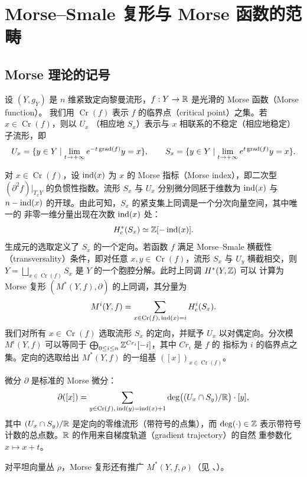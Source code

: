 \section{Morse--Smale 复形与 Morse 函数的范畴}

\subsection{Morse 理论的记号}

设 $(Y,g_Y)$ 是 $n$ 维紧致定向黎曼流形，$f:Y\to\mathbb{R}$ 是光滑的 Morse 函数（Morse function）。
我们用 $\operatorname{Cr}(f)$ 表示 $f$ 的临界点（critical point）之集。若 $x\in\operatorname{Cr}(f)$，则以 $U_x$
（相应地 $S_x$）表示与 $x$ 相联系的不稳定（相应地稳定）子流形，即
\[
  U_x=\{y\in Y\mid \lim_{t\to+\infty}e^{-t\operatorname{grad}(f)}y=x\},\qquad
  S_x=\{y\in Y\mid \lim_{t\to+\infty}e^{t\operatorname{grad}(f)}y=x\}.
\]

对 $x\in\operatorname{Cr}(f)$，设 $\operatorname{ind}(x)$ 为 $x$ 的 Morse 指标（Morse index），即二次型
$(\partial^2f)|_{T_xY}$ 的负惯性指数。流形 $S_x$ 与 $U_x$ 分别微分同胚于维数为 $\operatorname{ind}(x)$ 与
$n-\operatorname{ind}(x)$ 的开球。由此可知，$S_x$ 的紧支集上同调是一个分次向量空间，其中唯一的
非零一维分量出现在次数 $\operatorname{ind}(x)$ 处：
\[
  H^*_c(S_x)\simeq\mathbb{Z}[-\operatorname{ind}(x)].
\]
生成元的选取定义了 $S_x$ 的一个定向。若函数 $f$ 满足 Morse--Smale 横截性
（transversality）条件，即对任意 $x,y\in\operatorname{Cr}(f)$，流形 $S_x$ 与 $U_y$ 横截相交，则
$Y=\bigsqcup_{x\in\operatorname{Cr}(f)}S_x$ 是 $Y$ 的一个胞腔分解。此时上同调 $H^*(Y,\mathbb{Z})$ 可以
计算为 Morse 复形 $(M^*(Y,f),\partial)$ 的上同调，其分量为
\[
  M^i(Y,f)=\sum_{x\in\operatorname{Cr}(f),\,\operatorname{ind}(x)=i}H^i_c(S_x).
\]
我们对所有 $x\in\operatorname{Cr}(f)$ 选取流形 $S_x$ 的定向，并赋予 $U_x$ 以对偶定向。分次模
$M^i(Y,f)$ 可以等同于 $\bigoplus_{0\le i\le n}\mathbb{Z}^{Cr_i}[-i]$，其中 $Cr_i$ 是 $f$ 的
指标为 $i$ 的临界点之集。定向的选取给出 $M^*(Y,f)$ 的一组基 $([x])_{x\in\operatorname{Cr}(f)}$。

微分 $\partial$ 是标准的 Morse 微分：
\[
  \partial([x])=\sum_{y\in\operatorname{Cr}(f),\,\operatorname{ind}(y)=\operatorname{ind}(x)+1}
  \deg\bigl((U_x\cap S_y)/\mathbb{R}\bigr)\cdot[y],
\]
其中 $(U_x\cap S_y)/\mathbb{R}$ 是定向的零维流形（带符号的点集），而 $\deg(\cdot)\in\mathbb{Z}$
表示带符号计数的总点数。$\mathbb{R}$ 的作用来自梯度轨道（gradient trajectory）的自然
重参数化 $x\mapsto x+t$。

对平坦向量丛 $\rho$，Morse 复形还有推广 $M^*(Y,f,\rho)$（见 \cite{BZ}、\cite{HL}）。

